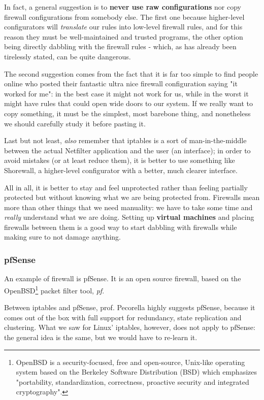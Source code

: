 In fact, a general suggestion is to \textbf{never use raw configurations} nor copy firewall configurations from somebody else. The first one because higher-level configurators will \textit{translate} our rules into low-level firewall rules, and for this reason they must be well-maintained and trusted programs, the other option being directly dabbling with the firewall rules - which, as has already been tirelessly stated, can be quite dangerous.

The second suggestion comes from the fact that it is far too simple to find people online who posted their fantastic ultra nice firewall configuration saying "it worked for me": in the best case it might not work for us, while in the worst it might have rules that could open wide doors to our system. If we really want to copy something, it must be the simplest, most barebone thing, and nonetheless we should carefully study it before pasting it.

Last but not least, \textit{also} remember that iptables is a sort of man-in-the-middle between the actual Netfilter application and the user (an interface); in order to avoid mistakes (or at least reduce them), it is better to use something like Shorewall, a higher-level configurator with a better, much clearer interface.

All in all, it is better to stay and feel unprotected rather than feeling partially protected but without knowing what we are being protected from. Firewalls mean more than other things that we need manuality: we have to take some time and \textit{really} understand what we are doing. Setting up \textbf{virtual machines} and placing firewalls between them is a good way to start dabbling with firewalls while making sure to not damage anything.


\subsubsection*{pfSense}
An example of firewall is pfSense. It is an open source firewall, based on the OpenBSD\footnote{OpenBSD is a security-focused, free and open-source, Unix-like operating system based on the Berkeley Software Distribution (BSD) which emphasizes "portability, standardization, correctness, proactive security and integrated cryptography".} packet filter tool, \textit{pf}.

Between iptables and pfSense, prof. Pecorella highly suggests pfSense, because it comes out of the box with full support for redundancy, state replication and clustering. What we saw for Linux' iptables, however, does not apply to pfSense: the general idea is the same, but we would have to re-learn it.